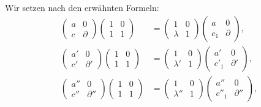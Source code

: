 \documentclass[11pt]{article}
\begin{document}
Wir setzen nach den erwähnten Formeln:
\begin{equation}
\begin{aligned}
\begin{pmatrix}a&0\\ c&\partial\end{pmatrix}
\begin{pmatrix}1&0\\ 1&1\end{pmatrix}
&=
\begin{pmatrix}1&0\\ \lambda&1\end{pmatrix}
\begin{pmatrix}a&0\\ c_1&\partial\end{pmatrix},\\
\begin{pmatrix}a'&0\\ c'&\partial'\end{pmatrix}
\begin{pmatrix}1&0\\ 1&1\end{pmatrix}
&=
\begin{pmatrix}1&0\\ \lambda'&1\end{pmatrix}
\begin{pmatrix}a'&0\\ c'_1&\partial'\end{pmatrix},\\
\begin{pmatrix}a''&0\\ c''&\partial''\end{pmatrix}
\begin{pmatrix}1&0\\ 1&1\end{pmatrix}
&=
\begin{pmatrix}1&0\\ \lambda''&1\end{pmatrix}
\begin{pmatrix}a''&0\\ c''_1&\partial''\end{pmatrix},
\end{aligned}
\tag{5}
\end{equation}
\end{document}
